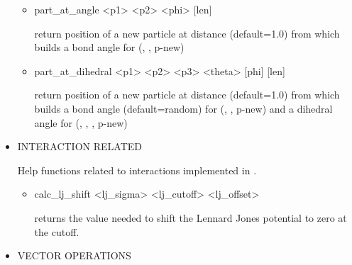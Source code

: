 \begin{itemize}
\begin{itemize}
   \item
\begin{code}
part\_at\_angle <p1> <p2> <phi> [len]
\end{code}
return position of a new particle at distance  (default=1.0)
from  which builds a bond angle  for (,
, p-new)
   \item
\begin{code}
part\_at\_dihedral <p1> <p2> <p3> <theta> [phi] [len]
\end{code}
return position of a new particle at distance  (default=1.0)
from  which builds a bond angle  (default=random) for
(, , p-new) and a dihedral angle  for
(, , , p-new)
  \end{itemize}
 \item
  INTERACTION RELATED
  
  Help functions related to interactions implemented in \es.
  \begin{itemize}
   \item 
     \begin{code}
       calc_lj_shift <lj_sigma> <lj_cutoff> <lj_offset>
     \end{code}
     returns the value needed to shift the Lennard Jones potential to zero at the cutoff.

  \end{itemize}

 \item
  VECTOR OPERATIONS


\end{itemize}
